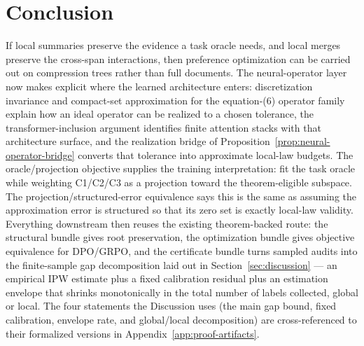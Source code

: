 \section{Conclusion}\label{sec:conclusion}

If local summaries preserve the evidence a task oracle needs, and local
merges preserve the cross-span interactions, then preference
optimization can be carried out on compression trees rather than full
documents. The neural-operator layer now makes explicit where the
learned architecture enters: discretization invariance and compact-set
approximation for the equation-(6) operator family explain how an ideal
operator can be realized to a chosen tolerance, the transformer-inclusion
argument identifies finite attention stacks with that architecture
surface, and the realization bridge of
Proposition~\ref{prop:neural-operator-bridge} converts that tolerance
into approximate local-law budgets. The oracle/projection objective
supplies the training interpretation: fit the task oracle while
weighting C1/C2/C3 as a projection toward the theorem-eligible
subspace. The projection/structured-error equivalence says this is the
same as assuming the approximation error is structured so that its zero
set is exactly local-law validity. Everything downstream then reuses
the existing theorem-backed route: the structural bundle gives root
preservation, the optimization bundle gives objective equivalence for
DPO/GRPO, and the certificate bundle turns sampled audits into the
finite-sample gap decomposition laid out in Section~\ref{sec:discussion}
--- an empirical IPW estimate plus a fixed calibration residual plus an
estimation envelope that shrinks monotonically in the total number of
labels collected, global or local. The four statements the Discussion
uses (the main gap bound, fixed calibration, envelope rate, and
global/local decomposition) are cross-referenced to their formalized
versions in Appendix~\ref{app:proof-artifacts}.

